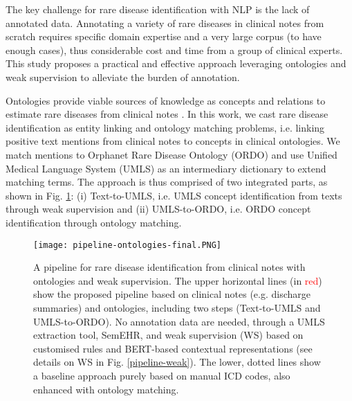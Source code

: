 \documentclass[letterpaper, 10 pt, conference]{ieeeconf}
\begin{document}
The key challenge for rare disease identification with NLP is the lack of annotated data. Annotating a variety of rare diseases in clinical notes from scratch requires specific domain expertise and a very large corpus (to have enough cases), thus considerable cost and time from a group of clinical experts. This study proposes a practical and effective approach leveraging ontologies and weak supervision to alleviate the burden of annotation.

Ontologies provide viable sources of knowledge as concepts and relations to estimate rare diseases from clinical notes \cite{kahn2017ontology}. In this work, we cast rare disease identification as entity linking and ontology matching problems, i.e. linking positive text mentions from clinical notes to concepts in clinical ontologies. We match mentions to Orphanet Rare Disease Ontology (ORDO) \cite{weinreich2008orphanet} and use Unified Medical Language System (UMLS) as an intermediary dictionary to extend matching terms. The approach is thus comprised of two integrated parts, as shown in Fig. \ref{pipeline-main}: (i) Text-to-UMLS, i.e. UMLS concept identification from texts through weak supervision and (ii) UMLS-to-ORDO, i.e. ORDO concept identification through ontology matching.

\begin{figure}
  \centering
  \texttt{[image: pipeline-ontologies-final.PNG]}
  \caption{A pipeline for rare disease identification from clinical notes with ontologies and weak supervision. The upper horizontal lines (in \textcolor{red}{red}) show the proposed pipeline based on clinical notes (e.g. discharge summaries) and ontologies, including two steps (Text-to-UMLS and UMLS-to-ORDO). No annotation data are needed, through a UMLS extraction tool, SemEHR, and weak supervision (WS) based on customised rules and BERT-based contextual representations (see details on WS in Fig. \ref{pipeline-weak}). The lower, dotted lines show a baseline approach purely based on manual ICD codes, also enhanced with ontology matching.}\label{pipeline-main}
\end{figure}
\end{document}
